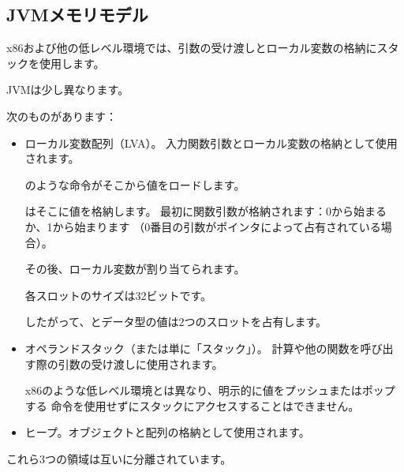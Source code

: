 \subsection{\ac{JVM}メモリモデル}

x86および他の低レベル環境では、引数の受け渡しとローカル変数の格納にスタックを使用します。

\ac{JVM}は少し異なります。

次のものがあります：

\begin{itemize}
\item ローカル変数配列（\ac{LVA}）。
入力関数引数とローカル変数の格納として使用されます。

のような命令がそこから値をロードします。

はそこに値を格納します。
最初に関数引数が格納されます：0から始まるか、1から始まります
（0番目の引数がポインタによって占有されている場合）。

その後、ローカル変数が割り当てられます。

各スロットのサイズは32ビットです。

したがって、とデータ型の値は2つのスロットを占有します。

\item オペランドスタック（または単に「スタック」）。
計算や他の関数を呼び出す際の引数の受け渡しに使用されます。

x86のような低レベル環境とは異なり、明示的に値をプッシュまたはポップする
命令を使用せずにスタックにアクセスすることはできません。

\item ヒープ。オブジェクトと配列の格納として使用されます。

\end{itemize}

これら3つの領域は互いに分離されています。